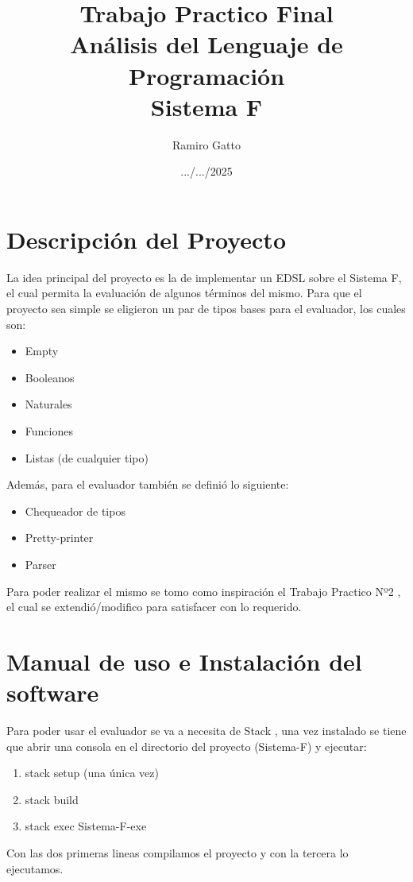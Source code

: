 \documentclass[12pt, titlepage, a4paper]{article}
\title{Trabajo Practico Final \\ 
Análisis del Lenguaje de Programación \\
Sistema F}
\author{Ramiro Gatto}
\date{.../.../2025}
\begin{document}
\maketitle

\section{Descripción del Proyecto}
La idea principal del proyecto es la de implementar un EDSL sobre el Sistema F, el cual permita la evaluación de algunos términos del mismo. Para  
que el proyecto sea simple se eligieron un par de tipos bases para el evaluador, los cuales son: 
\begin{itemize}[label=$\bullet$]
    \item {Empty}
    \item {Booleanos}
    \item {Naturales}
    \item {Funciones}
    \item {Listas (de cualquier tipo)}
\end{itemize}

\noindent Además, para el evaluador también se definió lo siguiente:
\begin{itemize}[label=$\bullet$]
    \item {Chequeador de tipos}
    \item {Pretty-printer}
    \item {Parser}
\end{itemize}

Para poder realizar el mismo se tomo como inspiración el Trabajo Practico Nº2 \cite{tp2:lambdaCalculoSimpleTipado}, el cual se 
extendió/modifico para satisfacer con lo requerido.


\section{Manual de uso e Instalación del software}
Para poder usar el evaluador se va a necesita de Stack \cite{haskellStack}, una vez instalado se tiene que abrir una consola en el 
directorio del proyecto (Sistema-F) y ejecutar:
\begin{enumerate}
    \item stack setup (una única vez)
    \item stack build
    \item stack exec Sistema-F-exe
\end{enumerate}

\noindent Con las dos primeras lineas compilamos el proyecto y con la tercera lo ejecutamos.
\end{document}

